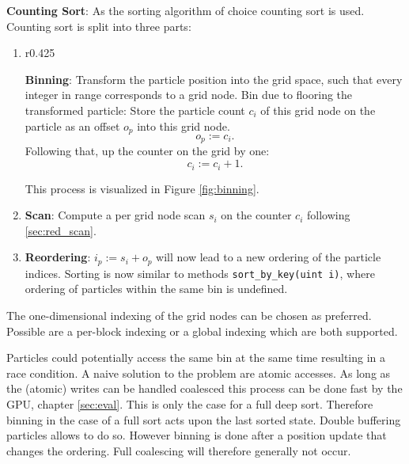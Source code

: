 \documentclass[m,times]{cgMA}
\begin{document}
\textbf{Counting Sort}: As the sorting algorithm of choice counting sort is used.
Counting sort is split into three parts:
\begin{enumerate}
  \item
\parbox[t]{\dimexpr\textwidth-\leftmargin}{%
      \vspace{-7.5}
      \begin{wrapfigure}[10]{r}{0.425\textwidth}
	\vspace{-33}
 
  \caption{Binning: Particle adds one to $c_i$ after storing it as $o_p$.}
  \label{fig:binning}
\end{wrapfigure}
\textbf{Binning}: Transform the particle position into the grid space, such that every integer in range corresponds to a grid node. Bin due to flooring the transformed particle: Store the particle count $c_i$ of this grid node on the particle as an offset $o_p$ into this grid node.$$o_p := c_i.$$Following that, up the counter on the grid by one:$$c_i := c_i +1.$$
}
This process is visualized in Figure \ref{fig:binning}.
  \item \textbf{Scan}: Compute a per grid node scan $s_i$ on the counter $c_i$ following \ref{sec:red_scan}.

  \item \textbf{Reordering}: $i_p := s_i + o_p$ will now lead to a new ordering of the particle indices. Sorting is now similar to methods \texttt{sort\_by\_key(uint i)}, where ordering of particles within the same bin is undefined.
\end{enumerate}
\begin{flushright}\cite{NVIDIA:NNSEARCH}\cite{MPM:GPU}\end{flushright}

The one-dimensional indexing of the grid nodes can be chosen as preferred. Possible are a per-block indexing or a global indexing which are both supported.

Particles could potentially access the same bin at the same time resulting in a race condition. A naive solution to the problem are atomic accesses. As long as the (atomic) writes can be handled coalesced this process can be done fast by the GPU, chapter \ref{sec:eval}. This is only the case for a full deep sort. Therefore binning in the case of a full sort acts upon the last sorted state. Double buffering particles allows to do so. However binning is done after a position update that changes the ordering. Full coalescing will therefore generally not occur.
\end{document}
